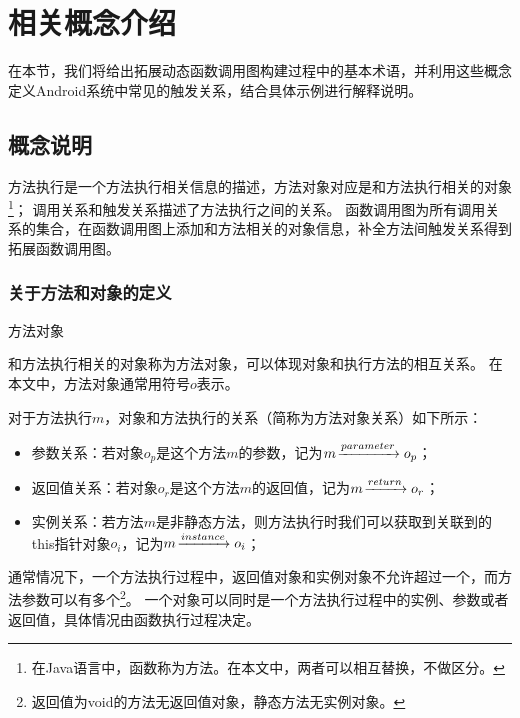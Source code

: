 \chapter{相关概念介绍}
\label{chp:definition}


在本节，我们将给出拓展动态函数调用图构建过程中的基本术语，并利用这些概念定义Android系统中常见的触发关系，结合具体示例进行解释说明。

\section{概念说明}
方法执行是一个方法执行相关信息的描述，方法对象对应是和方法执行相关的对象\footnote{在Java语言中，函数称为方法。在本文中，两者可以相互替换，不做区分。}；
调用关系和触发关系描述了方法执行之间的关系。
函数调用图为所有调用关系的集合，在函数调用图上添加和方法相关的对象信息，补全方法间触发关系得到拓展函数调用图。

\subsection{关于方法和对象的定义}

\begin{Def}
	方法对象%
\end{Def}

和方法执行相关的对象称为方法对象，可以体现对象和执行方法的相互关系。
在本文中，方法对象通常用符号$o$表示。
	

	对于方法执行$m$，对象和方法执行的关系（简称为方法对象关系）如下所示：
	\begin{itemize}
				\setlength{\itemsep}{1pt}
				\setlength{\parskip}{0pt}
				\setlength{\parsep}{0pt}
		\item 参数关系：若对象$o_p$是这个方法$m$的参数，记为$m \joinrel\xrightarrow{parameter} o_p$；%
		\item 返回值关系：若对象$o_r$是这个方法$m$的返回值，记为$m \joinrel\xrightarrow{return} o_r$；%
		\item 实例关系：若方法$m$是非静态方法，则方法执行时我们可以获取到关联到的this指针对象$o_i$，记为$m \joinrel\xrightarrow{instance} o_i$；%
	\end{itemize}

通常情况下，一个方法执行过程中，返回值对象和实例对象不允许超过一个，而方法参数可以有多个\footnote{返回值为void的方法无返回值对象，静态方法无实例对象。}。
一个对象可以同时是一个方法执行过程中的实例、参数或者返回值，具体情况由函数执行过程决定。



